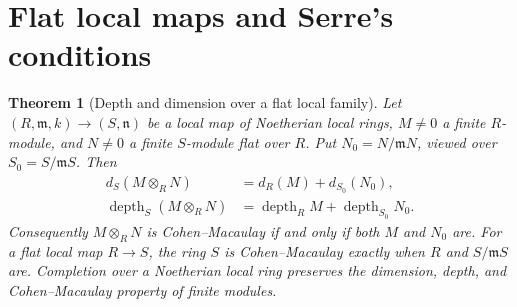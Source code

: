 \documentclass[11pt,oneside,openany]{book}
\newtheorem{theorem}{Theorem}[chapter]
\theoremstyle{definition}
\theoremstyle{remark}
\begin{document}
\section{Flat local maps and Serre's conditions}

\begin{theorem}[Depth and dimension over a flat local family]
\label{res:CM-10}
Let $(R,\mathfrak m,k)\to(S,\mathfrak n)$ be a local map of
Noetherian local rings, $M\ne0$ a finite $R$-module, and $N\ne0$
a finite $S$-module flat over $R$. Put $N_0=N/\mathfrak mN$,
viewed over $S_0=S/\mathfrak mS$. Then
\begin{align*}
 d_S(M\otimes_R N)&=d_R(M)+d_{S_0}(N_0),\\
 \operatorname{depth}_S(M\otimes_R N)
   &=\operatorname{depth}_R M+\operatorname{depth}_{S_0}N_0 .
\end{align*}
Consequently $M\otimes_R N$ is Cohen--Macaulay if and only if
both $M$ and $N_0$ are. For a flat local map $R\to S$, the
ring $S$ is Cohen--Macaulay exactly when $R$ and $S/\mathfrak mS$ are.
Completion over a Noetherian local ring preserves the
dimension, depth, and Cohen--Macaulay property of finite modules.
\end{theorem}
\end{document}

